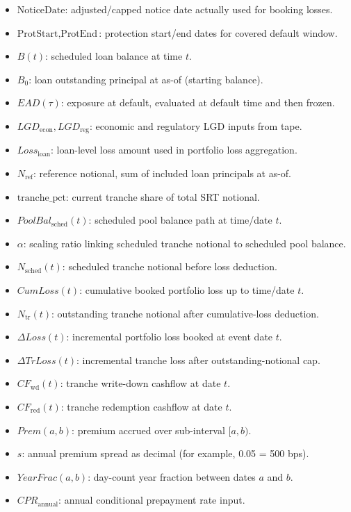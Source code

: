 \documentclass[11pt]{article}
\begin{document}
\begin{itemize}
  \item \(\text{NoticeDate}\): adjusted/capped notice date actually used for booking losses.
  \item \(\text{ProtStart}, \text{ProtEnd}\): protection start/end dates for covered default window.
  \item \(B(t)\): scheduled loan balance at time \(t\).
  \item \(B_0\): loan outstanding principal at as-of (starting balance).
  \item \(EAD(\tau)\): exposure at default, evaluated at default time and then frozen.
  \item \(LGD_{\text{econ}}, LGD_{\text{reg}}\): economic and regulatory LGD inputs from tape.
  \item \(Loss_{\text{loan}}\): loan-level loss amount used in portfolio loss aggregation.
  \item \(N_{\text{ref}}\): reference notional, sum of included loan principals at as-of.
  \item \(\text{tranche\_pct}\): current tranche share of total SRT notional.
  \item \(PoolBal_{\text{sched}}(t)\): scheduled pool balance path at time/date \(t\).
  \item \(\alpha\): scaling ratio linking scheduled tranche notional to scheduled pool balance.
  \item \(N_{\text{sched}}(t)\): scheduled tranche notional before loss deduction.
  \item \(CumLoss(t)\): cumulative booked portfolio loss up to time/date \(t\).
  \item \(N_{\text{tr}}(t)\): outstanding tranche notional after cumulative-loss deduction.
  \item \(\Delta Loss(t)\): incremental portfolio loss booked at event date \(t\).
  \item \(\Delta TrLoss(t)\): incremental tranche loss after outstanding-notional cap.
  \item \(CF_{\text{wd}}(t)\): tranche write-down cashflow at date \(t\).
  \item \(CF_{\text{red}}(t)\): tranche redemption cashflow at date \(t\).
  \item \(Prem(a,b)\): premium accrued over sub-interval \([a,b)\).
  \item \(s\): annual premium spread as decimal (for example, 0.05 = 500 bps).
  \item \(YearFrac(a,b)\): day-count year fraction between dates \(a\) and \(b\).
  \item \(CPR_{\text{annual}}\): annual conditional prepayment rate input.

\end{itemize}
\end{document}

